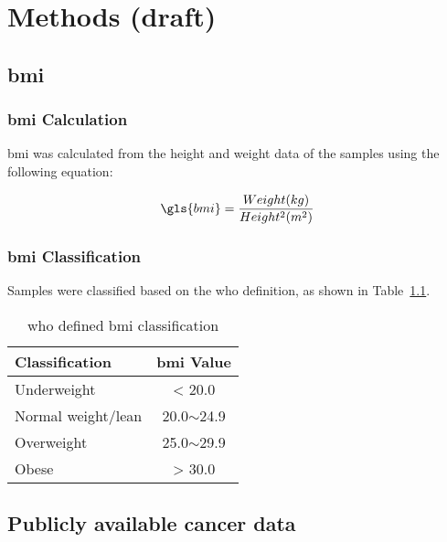 \chapter{Methods (draft)}
\label{ch:methods}

\section{\gls{bmi}}
\label{sec:bmi}

\subsection{\gls{bmi} Calculation}
\label{subsec:bmicalc}

\gls{bmi} was calculated from the height and weight data of the samples using the following equation:

\begin{equation}
	\label{eq:bmicalc}
	\gls{bmi} = \frac{Weight (kg)}{Height^2(m^2)}\\
\end{equation}

\subsection{\gls{bmi} Classification}
\label{subsec:bmiclassification}

Samples were classified based on the \gls{who} definition, as shown in Table~\cref{tab:whobmiclass}.
\begin{table}[hb]
	\caption{\gls{who} defined \gls{bmi} classification}
	\label{tab:whobmiclass}
	\begin{center}
		\begin{tabular}{lc}
			\bfseries {Classification} & \bfseries {\gls{bmi} Value}\\
			\hline
			\rule{0pt}{2.25ex}Underweight & \textless{} 20.0\\
			Normal weight/lean & 20.0$\sim$24.9\\
			Overweight & 25.0$\sim$29.9\\
			Obese & \textgreater{} 30.0\\
		\end{tabular}
	\end{center}
\end{table}

\section{Publicly available cancer data}
\label{sec:data}

